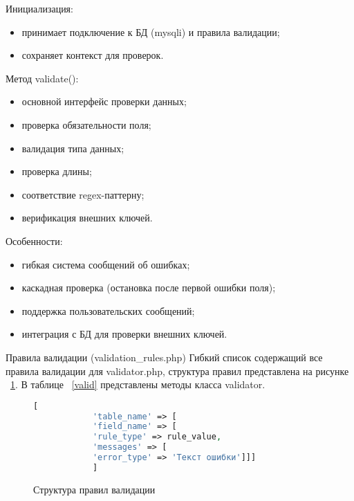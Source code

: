 Инициализация:
\begin{itemize}
	\item принимает подключение к БД (mysqli) и правила валидации;
	\item сохраняет контекст для проверок.
\end{itemize}

Метод validate():
\begin{itemize}
	\item основной интерфейс проверки данных;
	\item проверка обязательности поля;
	\item валидация типа данных;
	\item проверка длины;		
	\item соответствие regex-паттерну;
	\item верификация внешних ключей.
\end{itemize}

Особенности:
\begin{itemize}
	\item гибкая система сообщений об ошибках;
	\item каскадная проверка (остановка после первой ошибки поля);
	\item поддержка пользовательских сообщений;
	\item интеграция с БД для проверки внешних ключей.
\end{itemize}

Правила валидации (validation\_rules.php)
Гибкий список содержащий все правила валидации для validator.php, структура правил представлена на рисунке ~\ref{fig:strcode1}. В таблице ~\ref{valid} представлены методы класса validator.

\begin{figure}[ht]
	\begin{lstlisting}[language=Php]
			[
			'table_name' => [
			'field_name' => [
			'rule_type' => rule_value,
			'messages' => [
			'error_type' => 'Текст ошибки']]]
			]
			\end{lstlisting}
			\caption{Структура правил валидации}
			\label{fig:strcode1}
		\end{figure}

